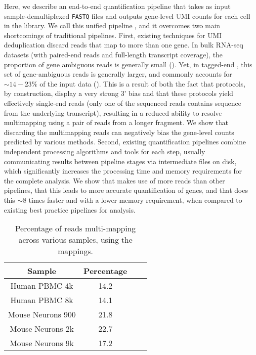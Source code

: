Here, we describe an end-to-end quantification pipeline that takes as input sample-demultiplexed \texttt{FASTQ} files and outputs gene-level UMI counts for each cell in the library. We call this unified pipeline \alevin, and it overcomes two main shortcomings of traditional pipelines. First, existing techniques for UMI deduplication discard reads that map to more than one gene. In bulk RNA-seq datasets (with paired-end reads and full-length transcript coverage), the proportion of gene ambiguous reads is generally small ().  Yet, in tagged-end \scrnaseq, this set of gene-ambiguous reads is generally larger, and commonly accounts for $\sim 14-23\%$ of the input data (). 
This is a result of both the fact that \dscrnaseq protocols, by construction, display a very strong 3' bias and that these protocols yield effectively single-end reads (only one of the sequenced reads contains sequence from the underlying transcript), resulting in a reduced ability to resolve multimapping using a pair of reads from a longer fragment.
We show that discarding the multimapping reads can negatively bias the gene-level counts predicted by various methods. Second, existing quantification pipelines combine independent processing algorithms and tools for each step, usually communicating results between pipeline stages via intermediate files on disk, which significantly increases the processing time and memory requirements for the complete analysis. We show that \alevin makes use of more reads than other pipelines, that this leads to more accurate quantification of genes, and that \alevin does this $\sim8$ times faster and with a lower memory requirement, when compared to existing best practice pipelines for \dscrnaseq analysis.

\begin{table}[htb]
\centering
\caption{Percentage of reads multi-mapping across various \scrnaseq samples, using the \alevin mappings.}
      \begin{tabular}{cccc}
        \hline
           Sample & Percentage \\ \hline
           Human PBMC 4k & 14.2 \\
           Human PBMC 8k & 14.1 \\
           Mouse Neurons 900 & 21.8 \\
           Mouse Neurons 2k & 22.7 \\
           Mouse Neurons 9k & 17.2 \\ \hline
      \end{tabular}
      \label{suptab:scmmRate}
\end{table}

